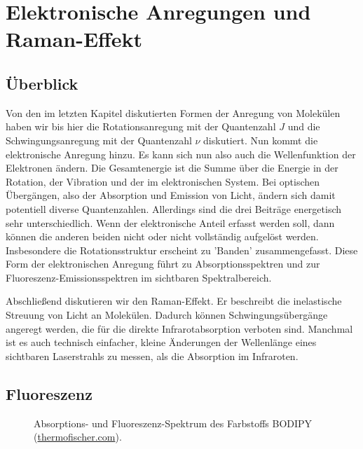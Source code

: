 \renewcommand{\lastmod}{16. Januar 2025}
\renewcommand{\chapterauthors}{Markus Lippitz}

\chapter{Elektronische Anregungen  und Raman-Effekt}


\section{Überblick}

Von den im letzten Kapitel diskutierten Formen der Anregung von Molekülen haben wir bis hier die Rotationsanregung mit der Quantenzahl $J$ und die Schwingungsanregung mit der Quantenzahl $\nu$ diskutiert. Nun kommt die  elektronische Anregung hinzu. Es kann sich nun also auch die Wellenfunktion der Elektronen ändern. Die Gesamtenergie ist die Summe über die Energie in der Rotation, der Vibration und der im elektronischen System. Bei optischen Übergängen, also der Absorption und Emission von Licht, ändern sich damit potentiell diverse Quantenzahlen. Allerdings sind die drei Beiträge energetisch sehr unterschiedlich. Wenn der elektronische Anteil erfasst werden soll, dann können die anderen beiden nicht oder nicht vollständig aufgelöst werden. Insbesondere die Rotationsstruktur erscheint zu 'Banden' zusammengefasst. Diese Form der elektronischen Anregung führt zu Absorptionsspektren  und zur Fluoreszenz-Emissionsspektren  im sichtbaren Spektralbereich.

Abschließend diskutieren wir den Raman-Effekt. Er beschreibt die inelastische Streuung von Licht an Molekülen. Dadurch können Schwingungsübergänge angeregt werden, die für die direkte Infrarotabsorption verboten sind. Manchmal ist es auch technisch einfacher, kleine Änderungen der Wellenlänge eines sichtbaren Laserstrahls zu messen, als die Absorption im Infraroten.


\section{Fluoreszenz}

\begin{figure}
  \caption{Absorptions- und Fluoreszenz-Spektrum des Farbstoffs BODIPY  (\href{https://www.thermofisher.com/de/de/home/life-science/cell-analysis/labeling-chemistry/fluorescence-spectraviewer.html?SID=srch-svtool&UID=10001moh}{thermofischer.com}).}
\end{figure}


